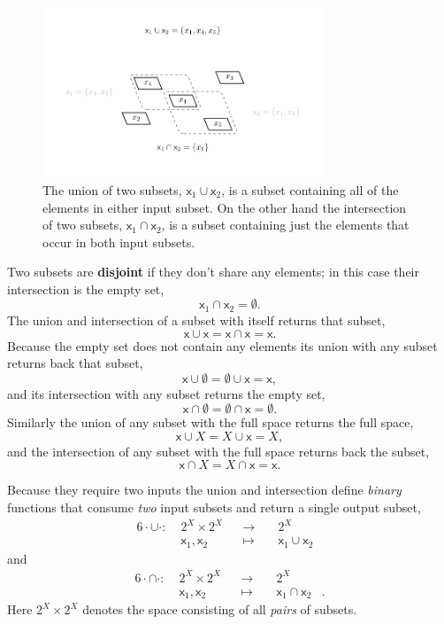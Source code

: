 \documentclass[
  letterpaper,
  DIV=11,
  numbers=noendperiod]{scrartcl}
\begin{document}
\begin{figure}

{\centering \includegraphics[width=0.75\textwidth,height=\textheight]{figures/overlapping_subsets_ui/overlapping_subsets_ui.pdf}

}

\caption{\label{fig-ui}The union of two subsets,
\(\mathsf{x}_1 \cup \mathsf{x}_2\), is a subset containing all of the
elements in either input subset. On the other hand the intersection of
two subsets, \(\mathsf{x}_1 \cap \mathsf{x}_2\), is a subset containing
just the elements that occur in both input subsets.}

\end{figure}

Two subsets are \textbf{disjoint} if they don't share any elements; in
this case their intersection is the empty set, \[
\mathsf{x}_{1} \cap \mathsf{x}_{2} = \emptyset.
\] The union and intersection of a subset with itself returns that
subset, \[
\mathsf{x} \cup \mathsf{x} = \mathsf{x} \cap \mathsf{x} = \mathsf{x}.
\] Because the empty set does not contain any elements its union with
any subset returns back that subset, \[
\mathsf{x} \cup \emptyset = \emptyset \cup \mathsf{x} = \mathsf{x},
\] and its intersection with any subset returns the empty set, \[
\mathsf{x} \cap \emptyset = \emptyset \cap \mathsf{x} = \emptyset.
\] Similarly the union of any subset with the full space returns the
full space, \[
\mathsf{x} \cup X = X \cup \mathsf{x} = X,
\] and the intersection of any subset with the full space returns back
the subset, \[
\mathsf{x} \cap X = X \cap \mathsf{x} = \mathsf{x}.
\]

Because they require two inputs the union and intersection define
\emph{binary} functions that consume \emph{two} input subsets and return
a single output subset, \begin{alignat*}{6}
\cdot \cup \cdot :\; & 2^{X} \times 2^{X}& &\rightarrow& \; & 2^{X} &
\\
& \mathsf{x}_1, \mathsf{x}_{2} & &\mapsto& & \mathsf{x}_1 \cup \mathsf{x}_2 &
\end{alignat*} and \begin{alignat*}{6}
\cdot \cap \cdot :\; & 2^{X} \times 2^{X}& &\rightarrow& \; & 2^{X} &
\\
& \mathsf{x}_1, \mathsf{x}_{2} & &\mapsto& & \mathsf{x}_1 \cap \mathsf{x}_2 &.
\end{alignat*} Here \(2^{X} \times 2^{X}\) denotes the space consisting
of all \emph{pairs} of subsets.
\end{document}
